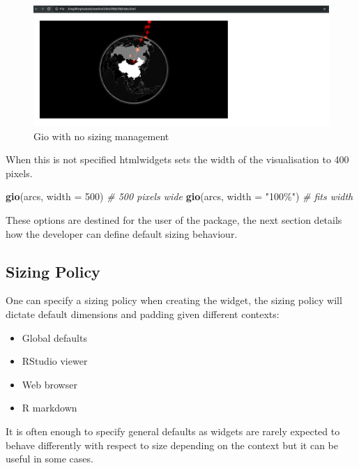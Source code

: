 \documentclass[
]{krantz}
\makeatletter
\newenvironment{Shaded}{\begin{snugshade}}{\end{snugshade}}
\newcommand{\CommentTok}[1]{\textcolor[rgb]{0.37,0.37,0.37}{\textit{#1}}}
\newcommand{\DataTypeTok}[1]{\textcolor[rgb]{0.27,0.27,0.27}{#1}}
\newcommand{\DecValTok}[1]{\textcolor[rgb]{0.06,0.06,0.06}{#1}}
\newcommand{\KeywordTok}[1]{\textcolor[rgb]{0.27,0.27,0.27}{\textbf{#1}}}
\newcommand{\NormalTok}[1]{#1}
\newcommand{\StringTok}[1]{\textcolor[rgb]{0.5,0.5,0.5}{#1}}
\providecommand{\tightlist}{%
  \setlength{\itemsep}{0pt}\setlength{\parskip}{0pt}}
\newenvironment{kframe}{%
\medskip{}
\setlength{\fboxsep}{.8em}
 \def\at@end@of@kframe{}%
 \ifinner\ifhmode%
  \def\at@end@of@kframe{\end{minipage}}%
  \begin{minipage}{\columnwidth}%
 \fi\fi%
 \def\FrameCommand##1{\hskip\@totalleftmargin \hskip-\fboxsep
 \colorbox{shadecolor}{##1}\hskip-\fboxsep
     \hskip-\linewidth \hskip-\@totalleftmargin \hskip\columnwidth}%
 \MakeFramed {\advance\hsize-\width
   \@totalleftmargin\z@ \linewidth\hsize
   \@setminipage}}%
 {\par\unskip\endMakeFramed%
 \at@end@of@kframe}
\renewenvironment{Shaded}{\begin{kframe}}{\end{kframe}}
\makeatother
\begin{document}
\begin{figure}
\centering
\includegraphics{images/gio-size-issue.png}
\caption{Gio with no sizing management}
\end{figure}

When this is not specified htmlwidgets sets the width of the visualisation to 400 pixels.

\begin{Shaded}
\begin{Highlighting}[]
\KeywordTok{gio}\NormalTok{(arcs, }\DataTypeTok{width =} \DecValTok{500}\NormalTok{) }\CommentTok{\# 500 pixels wide}
\KeywordTok{gio}\NormalTok{(arcs, }\DataTypeTok{width =} \StringTok{"100\%"}\NormalTok{) }\CommentTok{\# fits width}
\end{Highlighting}
\end{Shaded}

These options are destined for the user of the package, the next section details how the developer can define default sizing behaviour.

\hypertarget{sizing-policy}{%
\subsection*{Sizing Policy}\label{sizing-policy}}


One can specify a sizing policy when creating the widget, the sizing policy will dictate default dimensions and padding given different contexts:

\begin{itemize}
\tightlist
\item
  Global defaults
\item
  RStudio viewer
\item
  Web browser
\item
  R markdown
\end{itemize}

It is often enough to specify general defaults as widgets are rarely expected to behave differently with respect to size depending on the context but it can be useful in some cases.
\end{document}
